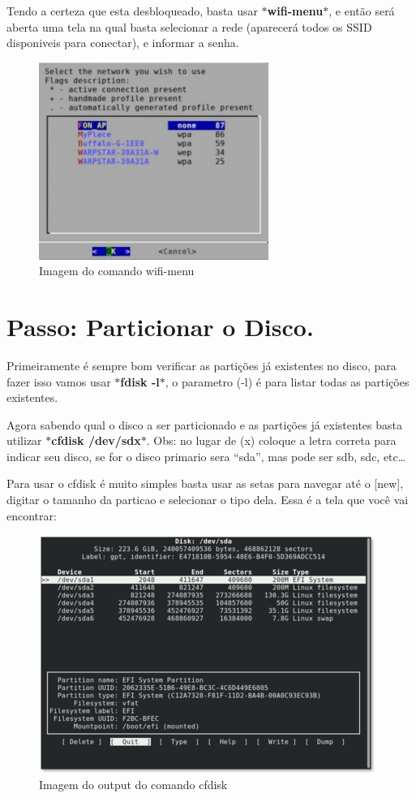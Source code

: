 \documentclass[12pt, a4paper] {article}
\begin{document}
		Tendo a certeza que esta desbloqueado, basta usar \textbf{$\ast$wifi-menu$\ast$}, e então será aberta uma tela na qual basta selecionar a rede (aparecerá todos os SSID disponiveis para conectar), e informar a senha.\\
		\begin{figure}[htb]
			\centering
			\includegraphics[width=75mm]{images/wifi-menu.jpg}
			\caption{Imagem do comando wifi-menu}
			\label{fig:Wifi-menu}
		\end{figure}

	\section{Passo: Particionar o Disco.}

	Primeiramente é sempre bom verificar as partições já existentes no disco, para fazer isso vamos usar \textbf{$\ast$fdisk -l$\ast$}, o parametro (-l) é para listar todas as partições existentes.

	Agora sabendo qual o disco a ser particionado e as partições já existentes basta utilizar \textbf{$\ast$cfdisk /dev/sdx$\ast$}. Obs: no lugar de (x) coloque a letra correta para indicar seu disco, se for o disco primario sera ``sda'', mas pode ser sdb, sdc, etc\ldots

	Para usar o cfdisk é muito simples basta usar as setas para navegar até o [new], digitar o tamanho da particao e selecionar o tipo dela. Essa é a tela que você vai encontrar:
	\begin{figure}[htb]
    \centering
    \includegraphics[width=\linewidth]{images/cfdisk.png}
    \caption{Imagem do output do comando cfdisk}
		\label{fig:cfdisk}
  \end{figure}
\end{document}
